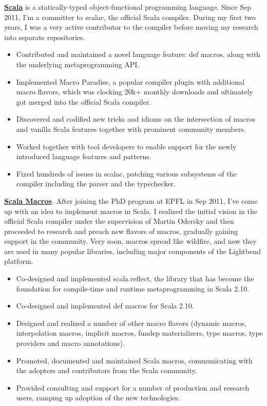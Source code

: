 \documentclass[margin, 10pt]{Stylesheet}
\begin{document}
\begin{resume}
\textbf{\href{https://github.com/scala/scala}{Scala}} is a statically-typed object-functional
programming language. Since Sep 2011, I'm a committer to scalac, the official Scala compiler.
During my first two years, I was a very active contributor to the compiler before moving my research
into separate repositories.

\begin{itemize} \itemsep -2pt
\item Contributed and maintained a novel language feature: def macros, along with the underlying
metaprogramming API.
\item Implemented Macro Paradise, a popular compiler plugin with additional macro flavors, which
was clocking 20k+ monthly downloads and ultimately got merged into the official Scala compiler.
\item Discovered and codified new tricks and idioms on the intersection of macros and vanilla Scala
features together with prominent community members.
\item Worked together with tool developers to enable support for the newly introduced language
features and patterns.
\item Fixed hundreds of issues in scalac, patching various subsystems of the compiler including
the parser and the typechecker.
\end{itemize}

\textbf{\href{http://scalamacros.org/}{Scala Macros}}. After joining the PhD program at EPFL in
Sep 2011, I've come up with an idea to implement macros in Scala. I realized the initial vision in
the official Scala compiler under the supervision of Martin Odersky and then proceeded to research
and preach new flavors of macros, gradually gaining support in the community. Very soon, macros
spread like wildfire, and now they are used in many popular libraries, including major components
of the Lightbend platform.

\begin{itemize} \itemsep -2pt
\item Co-designed and implemented scala.reflect, the library that has become the foundation for
compile-time and runtime metaprogramming in Scala 2.10.
\item Co-designed and implemented def macros for Scala 2.10.
\item Designed and realized a number of other macro flavors (dynamic macros, interpolation macros,
implicit macros, fundep materializers, type macros, type providers and macro annotations).
\item Promoted, documented and maintained Scala macros, communicating with the adopters
and contributors from the Scala community.
\item Provided consulting and support for a number of production and research users,
ramping up adoption of the new technologies.
\end{itemize}


\end{resume}
\end{document}

